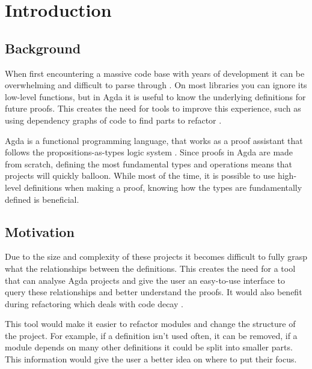 
\chapter{Introduction}


\section{Background}

When first encountering a massive code base with years of development it can be
overwhelming and difficult to parse through \cite{code_decay}. On most
libraries you can ignore its low-level functions, but in Agda it is useful to
know the underlying definitions for future proofs. This creates the need for
tools to improve this experience, such as using dependency graphs of code to
find parts to refactor \cite{dep_grah_refactoring}.

Agda is a functional programming language, that works as a proof assistant that
follows the propositions-as-types logic system \cite{agda_docs}. Since proofs
in Agda are made from scratch, defining the most fundamental types and
operations means that projects will quickly balloon. While most of the time, it
is possible to use high-level definitions when making a proof, knowing how the
types are fundamentally defined is beneficial. 

\section{Motivation}

Due to the size and complexity of these projects it becomes difficult to fully
grasp what the relationships between the definitions. This creates the need for
a tool that can analyse Agda projects and give the user an easy-to-use
interface to query these relationships and better understand the proofs. It
would also benefit during refactoring which deals with code decay
\cite{fowler2018refactoring}.

This tool would make it easier to refactor modules and change the structure of the
project. For example, if a definition isn't used often, it
can be removed, if a module depends on many other definitions it could be
split into smaller parts. This information would give the user a better
idea on where to put their focus.

